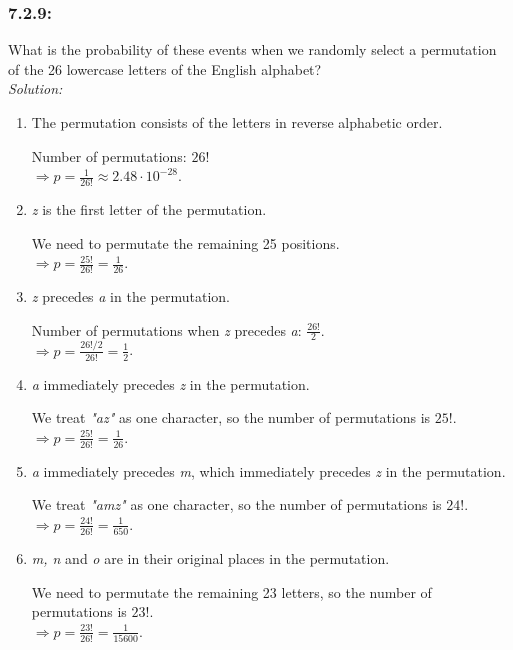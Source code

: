 \documentclass[a4paper]{article}
\begin{document}
	\subsubsection*{7.2.9:}
	What is the probability of these events when we randomly select a permutation of the 26 lowercase letters of the English alphabet?\\
	\textit{Solution:} 
	\begin{enumerate}[label=\alph*)]
	    \item The permutation consists of the letters in reverse alphabetic order.
	    
	    Number of permutations: $26!$ \\
	    $\Rightarrow p = \frac{1}{26!} \approx 2.48 \cdot 10^{-28}$.
	    \item \textit{z} is the first letter of the permutation.
	    
	    We need to permutate the remaining 25 positions. \\
	    $\Rightarrow p = \frac{25!}{26!} = \frac{1}{26}$.
	    \item \textit{z} precedes \textit{a} in the permutation.
	    
	    Number of permutations when \textit{z} precedes \textit{a}: $\frac{26!}{2}$. \\
	    $\Rightarrow p = \frac{26!/2}{26!} = \frac{1}{2}$.
	    \item \textit{a} immediately precedes \textit{z} in the permutation.
	    
	    We treat \textit{"az"} as one character, so the number of permutations is $25!$. \\
	    $\Rightarrow p = \frac{25!}{26!} = \frac{1}{26}$.
	    \item \textit{a} immediately precedes \textit{m}, which immediately precedes \textit{z} in the permutation.
	    
	    We treat \textit{"amz"} as one character, so the number of permutations is $24!$. \\
	    $\Rightarrow p = \frac{24!}{26!} = \frac{1}{650}$.
	    \item \textit{m, n} and \textit{o} are in their original places in the permutation.
	    
	    We need to permutate the remaining 23 letters, so the number of permutations is $23!$. \\
	    $\Rightarrow p = \frac{23!}{26!} = \frac{1}{15600}$.
	\end{enumerate}
	
\end{document}
